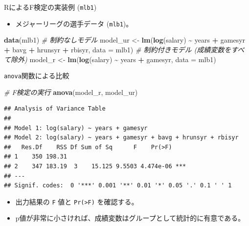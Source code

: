 \documentclass[
  ignorenonframetext,
]{beamer}
\newenvironment{Shaded}{\begin{snugshade}}{\end{snugshade}}
\newcommand{\AttributeTok}[1]{\textcolor[rgb]{0.13,0.29,0.53}{#1}}
\newcommand{\CommentTok}[1]{\textcolor[rgb]{0.56,0.35,0.01}{\textit{#1}}}
\newcommand{\FunctionTok}[1]{\textcolor[rgb]{0.13,0.29,0.53}{\textbf{#1}}}
\newcommand{\NormalTok}[1]{#1}
\newcommand{\OtherTok}[1]{\textcolor[rgb]{0.56,0.35,0.01}{#1}}
\newcommand{\SpecialCharTok}[1]{\textcolor[rgb]{0.81,0.36,0.00}{\textbf{#1}}}
\providecommand{\tightlist}{%
  \setlength{\itemsep}{0pt}\setlength{\parskip}{0pt}}
\begin{document}
\begin{frame}[fragile]{RによるF検定の実装例 (\texttt{mlb1})}
\label{rux306bux3088ux308bfux691cux5b9aux306eux5b9fux88c5ux4f8b-mlb1}
\begin{itemize}
\tightlist
\item
  メジャーリーグの選手データ (\texttt{mlb1})。
\end{itemize}

\begin{Shaded}
\begin{Highlighting}[]
\FunctionTok{data}\NormalTok{(mlb1)}
\CommentTok{\# 制約なしモデル}
\NormalTok{model\_ur }\OtherTok{\textless{}{-}} \FunctionTok{lm}\NormalTok{(}\FunctionTok{log}\NormalTok{(salary) }\SpecialCharTok{\textasciitilde{}}\NormalTok{ years }\SpecialCharTok{+}\NormalTok{ gamesyr }\SpecialCharTok{+}\NormalTok{ bavg }\SpecialCharTok{+} 
\NormalTok{               hrunsyr }\SpecialCharTok{+}\NormalTok{ rbisyr, }\AttributeTok{data =}\NormalTok{ mlb1)}
\CommentTok{\# 制約付きモデル (成績変数をすべて除外)}
\NormalTok{model\_r }\OtherTok{\textless{}{-}} \FunctionTok{lm}\NormalTok{(}\FunctionTok{log}\NormalTok{(salary) }\SpecialCharTok{\textasciitilde{}}\NormalTok{ years }\SpecialCharTok{+}\NormalTok{ gamesyr, }\AttributeTok{data =}\NormalTok{ mlb1)}
\end{Highlighting}
\end{Shaded}
\end{frame}

\begin{frame}[fragile]{\texttt{anova}関数による比較}
\label{anovaux95a2ux6570ux306bux3088ux308bux6bd4ux8f03}
\begin{Shaded}
\begin{Highlighting}[]
\CommentTok{\# F検定の実行}
\FunctionTok{anova}\NormalTok{(model\_r, model\_ur)}
\end{Highlighting}
\end{Shaded}

\begin{verbatim}
## Analysis of Variance Table
## 
## Model 1: log(salary) ~ years + gamesyr
## Model 2: log(salary) ~ years + gamesyr + bavg + hrunsyr + rbisyr
##   Res.Df    RSS Df Sum of Sq      F    Pr(>F)    
## 1    350 198.31                                  
## 2    347 183.19  3    15.125 9.5503 4.474e-06 ***
## ---
## Signif. codes:  0 '***' 0.001 '**' 0.01 '*' 0.05 '.' 0.1 ' ' 1
\end{verbatim}

\begin{itemize}
\tightlist
\item
  出力結果の \texttt{F} 値と \texttt{Pr(\textgreater{}F)} を確認する。
\item
  p値が非常に小さければ、成績変数はグループとして統計的に有意である。
\end{itemize}
\end{frame}
\end{document}
